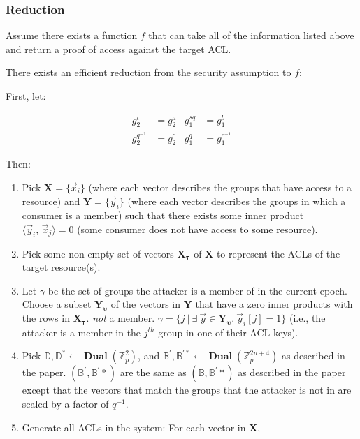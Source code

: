 \documentclass[pdftex,12pt,a4papaer,twoside,notitlepage]{report}
\DeclareMathOperator{\dual}{\mathbf{Dual}}
\newcommand{\iprod}[2]{\langle #1,\,#2\rangle}
\begin{document}
\begin{appendices}
\subsubsection{Reduction}

Assume there exists a function $f$ that can take all of the information listed
above and return a proof of access against the target ACL.

There exists an efficient reduction from the security assumption to $f$:

First, let:

\begin{align*}
  g_2^t &= g_2^a & g_1^{sq} &= g_1^b \\
  g_2^{q^{-1}} &= g_2^c & g_1^{q} &= g_1^{c^{-1}}
\end{align*}

Then: \\

\begin{enumerate}
\item Pick $\mathbf{X} = \{\vec{x}_i\}$ (where each vector describes the groups
  that have access to a resource) and $\mathbf{Y} = \{\vec{y}_i\}$ (where each
  vector describes the groups in which a consumer is a member) 
  such that there exists some inner product $\iprod{\vec{y}_i}{\vec{x}_j} = 0$
  (some consumer does not have access to some resource).
\item Pick some non-empty set of vectors $\mathbf{X_\tau}$ of
  $\mathbf{X}$ to represent the ACLs of the target resource(s).
\item Let $\gamma$ be the set of groups the attacker is a member of in the
  current epoch. Choose a subset $\mathbf{Y_{\upsilon}}$ of the vectors in
  $\mathbf{Y}$ that have a zero inner products with the rows in
  $\mathbf{X_\tau}$. \emph{not} a member. $\gamma = \{ j ~ | ~ \exists~\vec{y}
  \in \mathbf{Y_\upsilon}.~\vec{y}_i[j] = 1 \}$ (i.e., the attacker is a member
  in the $j^{\mathit{th}}$ group in one of their ACL keys).
\item Pick $\mathbb{D}, \mathbb{D^*} \leftarrow
  \dual(\mathbb{Z}_p^2)$, and $\mathbb{B^\prime}, \mathbb{B^{\prime *}} \leftarrow
  \dual(\mathbb{Z}_p^{2n+4})$ as described in the paper. 
  $(\mathbb{B^\prime}, \mathbb{B^\prime *})$ are the same as $(\mathbb{B},
  \mathbb{B^\prime *})$ as described in the paper except that the vectors that
  match the groups that the attacker is not in are scaled by a factor of
  $q^{-1}$.
\item Generate all ACLs in the system: For each vector in $\mathbf{X}$,


\end{enumerate}
\end{appendices}
\end{document}
